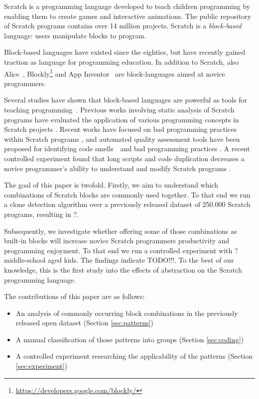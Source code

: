 \documentclass[preprint]{sigplanconf}
\newcommand{\nPatterns}{?}
\newcommand{\nKids}{?}
\newcommand{\todo}{TODO!!!}
\begin{document}
Scratch \cite{resnick_scratch:_2009} is a programming language developed to teach children programming by enabling them to create games and interactive animations. The public repository of Scratch programs contains over 14 million projects. Scratch is a \emph{block-based} language: users manipulate blocks to program.

Block-based languages have existed since the eighties, but have recently gained traction as language for programming education. In addition to Scratch, also Alice~\cite{conway_alice:_1994}, Blockly\footnote{\url{https://developers.google.com/blockly/}} and App Inventor~\cite{wolber_app_2011} are block-languages aimed at novice programmers.

Several studies have shown that block-based languages are powerful as tools for teaching programming~\cite{meerbaum-salant_learning_2010, b._moskal_evaluating_2005,cooper_teaching_2003,price_comparing_2015}. Previous works involving static analysis of Scratch programs have evaluated the application of various programming concepts in Scratch projects \cite{Maloney_2008,moreno_automatic_2014}. Recent works have focused on bad programming practices within Scratch programs \cite{Meerbaum_habits_2011}, and automated quality assessment tools have been proposed for identifying code smells~\cite{fowler_refactoring:_1999}~and bad programming practices \cite{boe_hairball:_2013,moreno_automatic_2014}. A recent controlled experiment found that long scripts and code duplication decreases a novice programmer's ability to understand and modify Scratch programs \cite{hermans_2016}.

The goal of this paper is twofold. Firstly, we aim to understand which combinations of Scratch blocks are commonly used together. To that end we run a clone detection algorithm over a previously released dataset of 250.000 Scratch programs, resulting in \nPatterns.

Subsequently, we investigate whether offering some of those combinations as built-in blocks will increase novice Scratch programmers productivity and programming enjoyment. To that end we run a controlled experiment with \nKids middle-school aged kids. The findings indicate \todo. To the best of our knowledge, this is the first study into the effects of abstraction on the Scratch programming language.

The contributions of this paper are as follows:

\begin{itemize}
	\item{An analysis of commonly occurring block combinations in the previously released open dataset (Section \ref{sec:patterns})}
	\item{A manual classification of those patterns into groups (Section \ref{sec:coding})}
	\item{A controlled experiment researching the applicability of the patterns (Section \ref{sec:experiment})}
\end{itemize}
\end{document}
